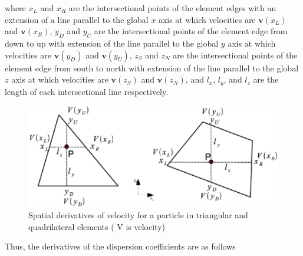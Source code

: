 where $x _L$ and $x _R$ are the intersectional points of the element edges with an extension of a  line parallel to the global $x$ axis at which velocities are $\mathbf{v}(x _L)$ and $\mathbf{v}(x _R)$, $y _D$ and $y _U$ are the intersectional points of the element edge from down to up with extension of the line parallel to the global $y$ axis at which velocities are $\mathbf{v}(y _D)$ and $\mathbf{v}(y _U)$, $z _S$ and $z _N$ are the intersectional points of the element edge from south to north with extension of the line parallel to the global $z$ axis at which velocities are $\mathbf{v}(z _S)$ and $\mathbf{v}(z _N)$, and $l _x$, $l _y$, and $l _z$ are the length of each intersectional line respectively.

\begin{figure}[htbp!]
\centering
\includegraphics[scale=0.60]{PART_II/C/DerivativeScheme.eps}
\caption{Spatial derivatives of velocity for a particle in triangular and quadrilateral elements ( V is velocity)}
\label{DerivativeVelocity}
\end{figure}

Thus, the derivatives of the dispersion coefficients are as follows \cite{hH02}

